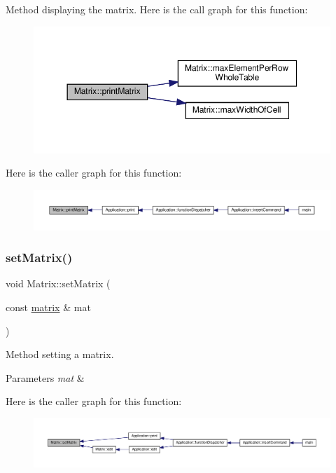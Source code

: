 Method displaying the matrix. Here is the call graph for this function\+:\nopagebreak
\begin{figure}[H]
\begin{center}
\leavevmode
\includegraphics[width=350pt]{class_matrix_aa1967ad240a5ffaf492800044b7275d9_cgraph}
\end{center}
\end{figure}
Here is the caller graph for this function\+:\nopagebreak
\begin{figure}[H]
\begin{center}
\leavevmode
\includegraphics[width=350pt]{class_matrix_aa1967ad240a5ffaf492800044b7275d9_icgraph}
\end{center}
\end{figure}
\mbox{\label{class_matrix_a8c45dd1354fa25e14065cab23f3074c0}} 
\subsubsection{\texorpdfstring{set\+Matrix()}{setMatrix()}}
{\footnotesize\ttfamily void Matrix\+::set\+Matrix (\begin{DoxyParamCaption}\item[{const \hyperlink{formula_8h_a869e2a5deeb3daa4c82d6bc91cf20d92}{matrix} \&}]{mat }\end{DoxyParamCaption})\hspace{0.3cm}{\ttfamily [inline]}}

Method setting a matrix. 
\begin{DoxyParams}{Parameters}
{\em mat} & \\
\hline
\end{DoxyParams}
Here is the caller graph for this function\+:\nopagebreak
\begin{figure}[H]
\begin{center}
\leavevmode
\includegraphics[width=350pt]{class_matrix_a8c45dd1354fa25e14065cab23f3074c0_icgraph}
\end{center}
\end{figure}


